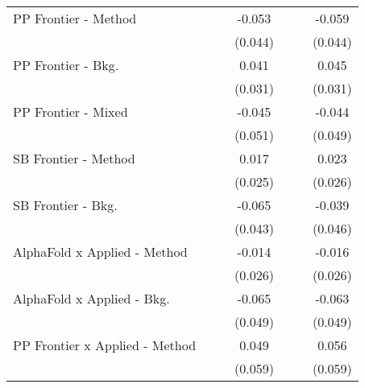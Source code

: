 \begin{tabular}{lcccccc}
   PP Frontier - Method           &                &              & -0.053      &                &              & -0.059\\   
                                  &                &              & (0.044)     &                &              & (0.044)\\   
   PP Frontier - Bkg.             &                &              & 0.041       &                &              & 0.045\\   
                                  &                &              & (0.031)     &                &              & (0.031)\\   
   PP Frontier - Mixed            &                &              & -0.045      &                &              & -0.044\\   
                                  &                &              & (0.051)     &                &              & (0.049)\\   
   SB Frontier - Method           &                &              & 0.017       &                &              & 0.023\\   
                                  &                &              & (0.025)     &                &              & (0.026)\\   
   SB Frontier - Bkg.             &                &              & -0.065      &                &              & -0.039\\   
                                  &                &              & (0.043)     &                &              & (0.046)\\   
   AlphaFold x Applied - Method   &                &              & -0.014      &                &              & -0.016\\   
                                  &                &              & (0.026)     &                &              & (0.026)\\   
   AlphaFold x Applied - Bkg.     &                &              & -0.065      &                &              & -0.063\\   
                                  &                &              & (0.049)     &                &              & (0.049)\\   
   PP Frontier x Applied - Method &                &              & 0.049       &                &              & 0.056\\   
                                  &                &              & (0.059)     &                &              & (0.059)\\   

\end{tabular}
